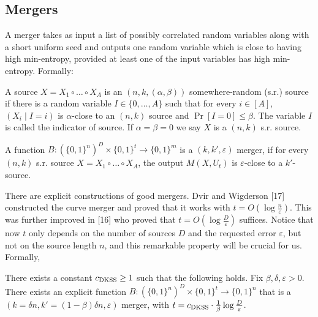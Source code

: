 \subsection*{Mergers}
A merger takes as input a list of possibly correlated random variables along with a short uniform seed and outputs one random variable which is close to having high min-entropy, provided at least one of the input variables has high min-entropy. Formally:
\begin{definition}
A source $X=X_1\circ\ldots\circ X_A$ is an $(n,k,(\alpha,\beta))$ somewhere-random (s.r.) source if there is a random variable $I\in\{0,\ldots,A\}$ such that for every $i\in[A]$, $(X_i\mid I=i)$ is $\alpha$-close to an $(n,k)$ source and $\Pr[I=0]\le\beta$. The variable $I$ is called the indicator of source. If $\alpha=\beta=0$ we say $X$ is a $(n,k)$ s.r. source.
\end{definition}
\begin{definition}[merger]
A function $B:(\{0,1\}^n)^D\times\{0,1\}^t\to\{0,1\}^m$ is a $(k,k',\varepsilon)$ merger, if for every $(n,k)$ s.r. source $X=X_1\circ\ldots\circ X_A$, the output $M(X,U_t)$ is $\varepsilon$-close to a $k'$-source.
\end{definition}
There are explicit constructions of good mergers. Dvir and Wigderson [17] constructed the curve merger and proved that it works with $t=O(\log\frac n\varepsilon)$. This was further improved in [16] who proved that $t=O(\log\frac D\varepsilon)$ suffices. Notice that now $t$ only depends on the number of sources $D$ and the requested error $\varepsilon$, but not on the source length $n$, and this remarkable property will be crucial for us. Formally,
\begin{theorem}[{[17,16]}]
There exists a constant $c_{\rm DKSS}\ge1$ such that the following holds. Fix $\beta,\delta,\varepsilon>0$. There exists an explicit function $B:(\{0,1\}^n)^D\times\{0,1\}^t\to\{0,1\}^n$ that is a $(k=\delta n,k'=(1-\beta)\delta n,\varepsilon)$ merger, with $t=c_{\rm DKSS}\cdot\frac1\beta\log\frac D\varepsilon$.
\end{theorem}
